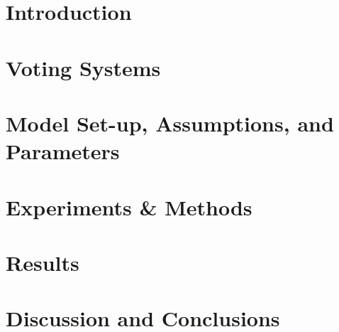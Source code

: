 \section{Introduction}
\label{sec:intro}
    


\section{Voting Systems}
\label{sec:voting_systems}
    


\section{Model Set-up, Assumptions, and Parameters}
\label{sec:model}
    


\section{Experiments \& Methods}
\label{sec:experiments}
    



\section{Results}
\label{sec:results}
    



\section{Discussion and Conclusions}
\label{sec:conclusion}
    
